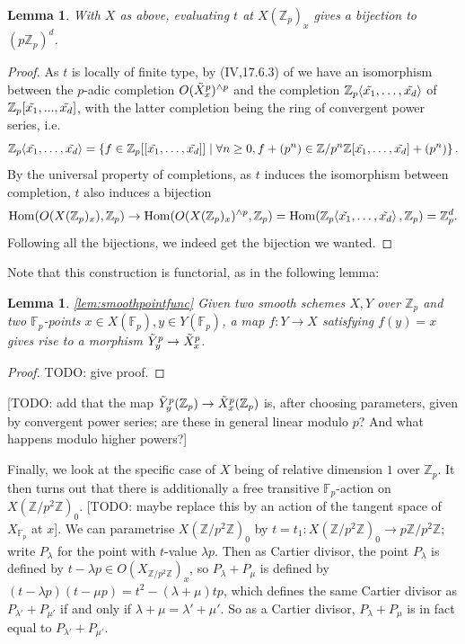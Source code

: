 \documentclass{article}
\newcommand{\Z}{\mathbb{Z}}
\newcommand{\F}{\mathbb{F}}
\renewcommand{\angle}[1]{\hspace{-2pt}\left\langle #1 \right\rangle}
\DeclareMathOperator{\Hom}{Hom}
\theoremstyle{plain}
\newtheorem{lem}[thm]{Lemma} %
\theoremstyle{definition}
\theoremstyle{remark}
\begin{document}
\begin{lem}
With $X$ as above, evaluating $t$ at $X(\Z_p)_x$ gives a bijection to $(p\Z_p)^d$.
\end{lem}
\begin{proof}
As $t$ is locally of finite type, by (IV,17.6.3) of \cite{ega} we have an isomorphism between the $p$-adic completion $O(\Tilde{X}_x^p)^{\wedge p}$ and the completion $\Z_p\angle{\Tilde{x_1},\dots, \Tilde{x_d}}$ of $\Z_p[\Tilde{x_1},...,\Tilde{x_d}]$, with the latter completion being the ring of convergent power series, i.e.
\[
\Z_p\angle{\Tilde{x_1},\dots, \Tilde{x_d}} = \left\{f \in \Z_p[[\Tilde{x_1},\dots,\Tilde{x_d}]] \mid \forall n \geq 0, f + (p^n) \in \Z/p^n\Z[\Tilde{x_1},\dots,\tilde{x_d}] + (p^n) \right\}.
\]
By the universal property of completions, as $t$ induces the isomorphism between completion, $t$ also induces a bijection $$\Hom(O(X(\Z_p)_x), \Z_p) \to \Hom(O(X(\Z_p)_x)^{\wedge p}, \Z_p) = \Hom(\Z_p\angle{\Tilde{x_1},\dots,\Tilde{x_d}},\Z_p) = \Z_p^d.$$ Following all the bijections, we indeed get the bijection we wanted.
\end{proof}

Note that this construction is functorial, as in the following lemma:
\begin{lem}
\ref{lem:smoothpointfunc}
Given two smooth schemes $X,Y$ over $\Z_p$ and two $\F_p$-points $x\in X(\F_p), y\in Y(\F_p)$, a map $f: Y \to X$ satisfying $f(y) = x$ gives rise to a morphism $\Tilde{Y}_y^p \to \Tilde{X}_x^p$.
\end{lem}
\begin{proof}
TODO: give proof.
\end{proof}

[TODO: add that the map $\Tilde{Y}_y^p(\Z_p) \to \Tilde{X}_x^p(\Z_p)$ is, after choosing parameters, given by convergent power series; are these in general linear modulo $p$? And what happens modulo higher powers?]

Finally, we look at the specific case of $X$ being of relative dimension $1$ over $\Z_p$. It then turns out that there is additionally a free transitive $\F_p$-action on $X(\Z/p^2\Z)_0$. [TODO: maybe replace this by an action of the tangent space of $X_{\F_p}$ at $x$]. We can parametrise $X(\Z/p^2\Z)_0$ by $t = t_1 : X(\Z/p^2\Z)_0 \to p\Z/p^2\Z$; write $P_{\lambda}$ for the point with $t$-value $\lambda p$. Then as Cartier divisor, the point $P_{\lambda}$ is defined by $t - \lambda p \in O(X_{\Z/p^2\Z})_x$, so $P_{\lambda} + P_{\mu}$ is defined by $(t-\lambda p)(t-\mu p) = t^2 - (\lambda + \mu)tp$, which defines the same Cartier divisor as $P_{\lambda'} + P_{\mu'}$ if and only if $\lambda + \mu = \lambda' + \mu'$. So as a Cartier divisor, $P_{\lambda} + P_{\mu}$ is in fact equal to $P_{\lambda'} + P_{\mu'}$.
\end{document}
